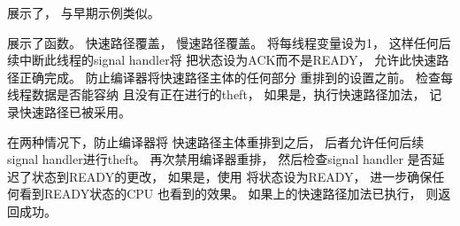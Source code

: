 \QuickQuizEnd

\begin{fcvref}
展示了，
与早期示例类似。
\end{fcvref}

\begin{listing}

\caption{Signal-Theft Limit Counter加法函数}
\label{lst:count:Signal-Theft Limit Counter Add Function}
\end{listing}

\begin{listing}

\caption{Signal-Theft Limit Counter减法函数}
\label{lst:count:Signal-Theft Limit Counter Subtract Function}
\end{listing}

\begin{fcvref}
展示了函数。
快速路径覆盖，
慢速路径覆盖。
将每线程变量设为1，
这样任何后续中断此线程的signal handler将
把状态设为ACK而不是READY，
允许此快速路径正确完成。
防止编译器将快速路径主体的任何部分
重排到的设置之前。
检查每线程数据是否能容纳
且没有正在进行的theft，
如果是，执行快速路径加法，
记录快速路径已被采用。

在两种情况下，防止编译器将
快速路径主体重排到之后，
后者允许任何后续signal handler进行theft。
再次禁用编译器重排，
然后检查signal handler
是否延迟了状态到READY的更改，
如果是，使用
将状态设为READY，
进一步确保任何看到READY状态的CPU
也看到的效果。
如果上的快速路径加法已执行，
则返回成功。
\end{fcvref}

